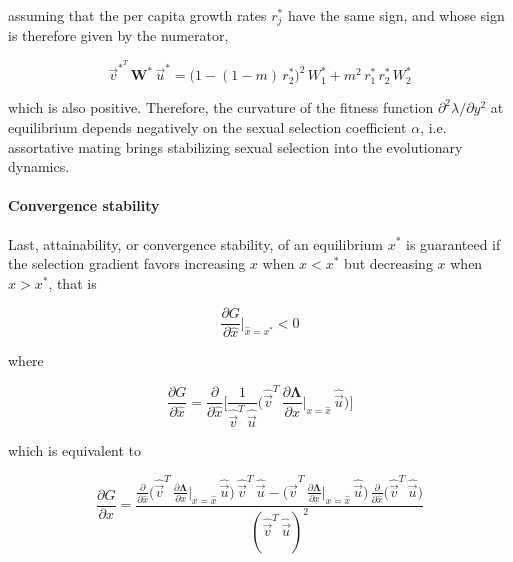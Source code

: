 assuming that the per capita growth rates $r^*_j$ have the same sign, and whose sign is therefore given by the numerator,

\begin{equation}
    \overrightarrow{v}^*^T\,\pmb W^*\,\overrightarrow{u}^* = \big(1-(1-m)\,r^*_2\big)^2\,W^*_1 + m^2\,r^*_1\,r^*_2\,W^*_2
\end{equation}

which is also positive. Therefore, the curvature of the fitness function $\partial^2 \lambda / \partial y^2$ at equilibrium depends negatively on the sexual selection coefficient $\alpha$, i.e. assortative mating brings stabilizing sexual selection into the evolutionary dynamics.

\paragraph{Convergence stability} Last, attainability, or convergence stability, of an equilibrium $x^*$ is guaranteed if the selection gradient favors increasing $x$ when $x < x^*$ but decreasing $x$ when $x > x^*$, that is

\begin{equation}
    \frac{\partial G}{\partial \hat{x}}\bigg|_{\hat{x}=x^*} < 0
\end{equation}

where 

\begin{equation}
    \frac{\partial G}{\partial \hat{x}} = \frac{\partial}{\partial \hat{x}} \Bigg[ \frac{1}{\hat{\overrightarrow{v}}^T\,\hat{\overrightarrow{u}}} \bigg( \hat{\overrightarrow{v}}^T\,\frac{\partial \pmb{\Lambda}}{\partial x}\bigg|_{x=\hat{x}}\,\hat{\overrightarrow{u}} \bigg) \Bigg]
\end{equation}

which is equivalent to

\begin{equation}
    \frac{\partial G}{\partial \hat{x}} = \frac{\frac{\partial}{\partial \hat{x}} \big( \hat{\overrightarrow{v}}^T\,\frac{\partial \pmb{\Lambda}}{\partial x}\big|_{x=\hat{x}}\,\hat{\overrightarrow{u}} \big)\,\hat{\overrightarrow{v}}^T\,\hat{\overrightarrow{u}} - \big( \hat{\overrightarrow{v}}^T\,\frac{\partial \pmb{\Lambda}}{\partial x}\big|_{x=\hat{x}}\,\hat{\overrightarrow{u}} \big)\,\frac{\partial}{\partial \hat{x}} \big(\hat{\overrightarrow{v}}^T\,\hat{\overrightarrow{u}}\big)}{(\hat{\overrightarrow{v}}^T\,\hat{\overrightarrow{u}})^2}
    \label{eq:deriv_gradient}
\end{equation}

